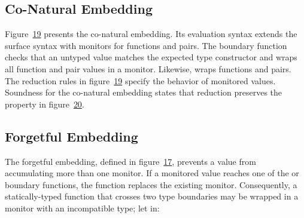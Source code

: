 \documentclass[screen=true, 10pt, acmsmall]{acmart}
\makeatletter
\newcommand{\Sendabbrev}[1]{#1\@}
\let\SOriginalthesubsubsection\thesubsubsection
\newcommand{\Ssubsection}[2]{\subsection[#1]{#2}\let\thesubsubsection\SOriginalthesubsubsection}
\newcommand{\AutobibLink}[1]{\color{ACMPurple}{#1}}
\newcommand{\FigureRef}[2]{#1}
\newcommand{\Autobibref}[1]{#1}
\providecommand{\AutobibLink}[1]{#1}
\newcommand{\tint}{\mathsf{Int}}
\newcommand{\tann}[2]{(#1\!:\!#2)}
\newcommand{\rrfont}[1]{\mathsf{#1}}
\newcommand{\vfromsta}{\mathcal{S}}
\newcommand{\vfromdyn}{\mathcal{D}}
\newcommand{\vfromdynC}{\vfromdyn_{\rrfont{C}}}
\newcommand{\vfromstaC}{\vfromsta_{\rrfont{C}}}
\newcommand{\vfromdynF}{\vfromdyn_{\rrfont{F}}}
\newcommand{\vfromstaF}{\vfromsta_{\rrfont{F}}}
\newcommand{\vlam}[2]{\lambda #1.\, #2}
\makeatother
\begin{document}

\Ssubsection{Co{-}Natural Embedding}{Co{-}Natural Embedding}\label{t:x28part_x22secx3aconaturalx2dembeddingx22x29}

Figure~\hyperref[t:x28counter_x28x22figurex22_x22figx3aconaturalx2dreductionx22x29x29]{\FigureRef{19}{t:x28counter_x28x22figurex22_x22figx3aconaturalx2dreductionx22x29x29}} presents the co{-}natural embedding.
Its evaluation syntax extends the surface syntax with monitors for functions and pairs.
The \relax{$\vfromdynC$} boundary function checks that an untyped value matches the expected
 type constructor and wraps all function and pair values in a monitor.
Likewise, \relax{$\vfromstaC$} wraps functions and pairs.
The reduction rules in figure~\hyperref[t:x28counter_x28x22figurex22_x22figx3aconaturalx2dreductionx22x29x29]{\FigureRef{19}{t:x28counter_x28x22figurex22_x22figx3aconaturalx2dreductionx22x29x29}} specify the behavior
 of monitored values.
Soundness for the co{-}natural embedding states that reduction preserves the
 property in figure~\hyperref[t:x28counter_x28x22figurex22_x22figx3aconaturalx2dpreservationx22x29x29]{\FigureRef{20}{t:x28counter_x28x22figurex22_x22figx3aconaturalx2dpreservationx22x29x29}}.

\Ssubsection{Forgetful Embedding}{Forgetful Embedding}\label{t:x28part_x22secx3aforgetfulx2dembeddingx22x29}

The forgetful embedding, defined in figure~\hyperref[t:x28counter_x28x22figurex22_x22figx3aforgetfulx2dreductionx22x29x29]{\FigureRef{17}{t:x28counter_x28x22figurex22_x22figx3aforgetfulx2dreductionx22x29x29}}, prevents a
 value from accumulating more than one monitor.
If a monitored value reaches one of the \relax{$\vfromdynF$} or \relax{$\vfromstaF$} boundary
 functions, the function replaces the existing monitor.
Consequently, a statically{-}typed function that crosses two type boundaries
 may be wrapped in a monitor with an incompatible type; let \relax{$f = (\vlam{\tann{x}{\tint}}{{-2}})$} in:
\end{document}
